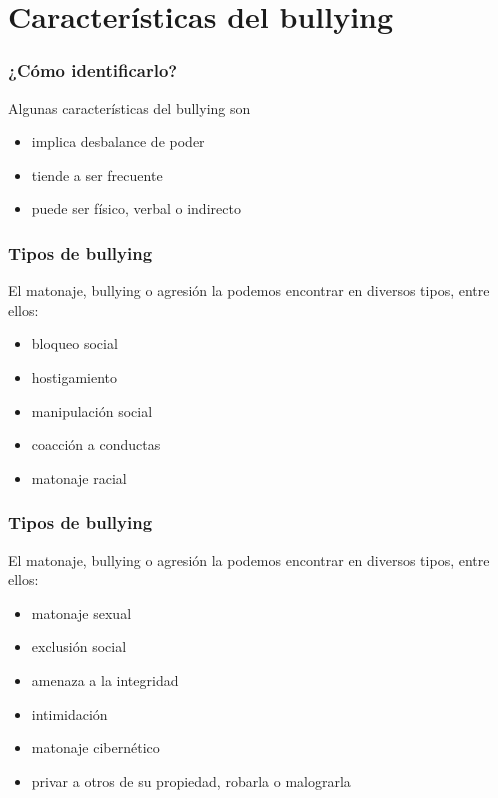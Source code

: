 \documentclass[12pt,spanish,x11names]{beamer}
\begin{document}
\section{Características del bullying}
\begin{frame}
  \frametitle{¿Cómo identificarlo?}
  \begin{block}{Algunas características del bullying son}
    \pause
    \begin{itemize}
    \item<+-> implica desbalance de poder
    \item<+-> tiende a ser frecuente
    \item<+-> puede ser físico, verbal o indirecto
    \end{itemize}
  \end{block}
\end{frame}
\begin{frame}
  \frametitle{Tipos de bullying}
  \begin{exampleblock}{El matonaje, bullying o agresión la podemos encontrar en diversos tipos, entre ellos:}
    \pause
    \begin{itemize}
    \item<+-> bloqueo social
    \item<+-> hostigamiento
    \item<+-> manipulación social
    \item<+-> coacción a conductas
    \item<+-> matonaje racial
    \end{itemize}
  \end{exampleblock}
\end{frame}
\begin{frame}
  \frametitle{Tipos de bullying}
  \begin{exampleblock}{El matonaje, bullying o agresión la podemos encontrar en diversos tipos, entre ellos:}
    \begin{itemize}
    \item<+-> matonaje sexual
    \item<+-> exclusión social
    \item<+-> amenaza a la integridad
    \item<+-> intimidación
    \item<+-> matonaje cibernético
    \item<+-> privar a otros de su propiedad, robarla o malograrla
    \end{itemize}
  \end{exampleblock}
\end{frame}
\end{document}
